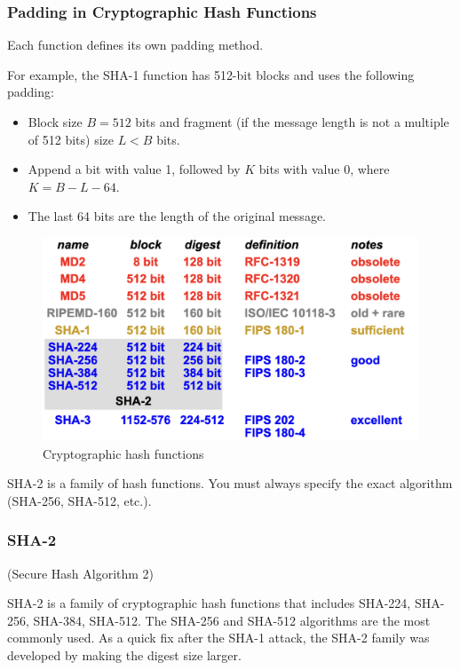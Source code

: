 \subsubsection*{Padding in Cryptographic Hash Functions}
Each function defines its own padding method.

For example, the SHA-1 function has 512-bit blocks and uses the following padding:
\begin{itemize}
    \item Block size $B = 512$ bits and fragment (if the message length is not a multiple of 512 bits) size $L < B$ bits.
    \item Append a bit with value 1, followed by $K$ bits with value 0, where $K = B - L - 64$.
    \item The last 64 bits are the length of the original message.
\end{itemize}

\begin{figure}[H]
    \centering
    \includegraphics[width=0.8\linewidth]{Images/Cryptography/crypto_hash_functions.png}
    \caption{Cryptographic hash functions}
\end{figure}

\begin{tcolorbox}[colback=red!10!white, colframe=red!70!black, coltitle=white, title=Beware]
SHA-2 is a family of hash functions. You must always specify the exact algorithm (SHA-256, SHA-512, etc.).
\end{tcolorbox}

\subsubsection*{SHA-2}
\begin{center}
    (Secure Hash Algorithm 2)
\end{center}
SHA-2 is a family of cryptographic hash functions that includes SHA-224, SHA-256, SHA-384, SHA-512. The SHA-256 and SHA-512 algorithms are the most commonly used. As a quick fix after the SHA-1 attack, the SHA-2 family was developed by making the digest size larger.

